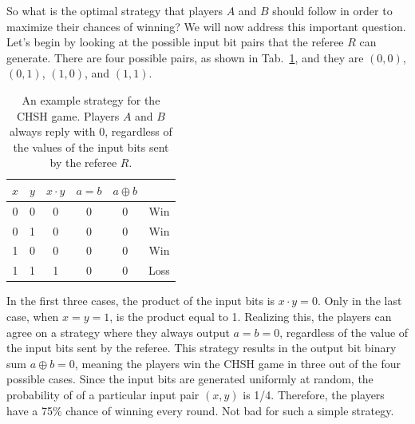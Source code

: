 So what is the optimal strategy that players $A$ and $B$ should follow in order to maximize their chances of winning?
We will now address this important question.
Let's begin by looking at the possible input bit pairs that the referee $R$ can generate.
There are four possible pairs, as shown in Tab.~\ref{tab:4-2_chsh_strategy}, and they are $(0,0)$, $(0,1)$, $(1,0)$, and $(1,1)$.
\begin{table}[h]
    \setcellgapes{5pt}
    \renewcommand\theadfont{}
    \makegapedcells
    \centering
    \begin{tabular}{cccccc}
        \hline
        $x$ & $y$ & $x\cdot y$ & $a=b$ & $a\oplus b$ & \\
        \hline
        0 & 0 & 0 & 0 & 0 & Win \\
        0 & 1 & 0 & 0 & 0 & Win \\
        1 & 0 & 0 & 0 & 0 & Win \\
        1 & 1 & 1 & 0 & 0 & Loss \\
        \hline
    \end{tabular}
    \caption[CHSH game classical strategy.]{An example strategy for the CHSH game. Players $A$ and $B$ always reply with 0, regardless of the values of the input bits sent by the referee $R$.}
    \label{tab:4-2_chsh_strategy}
\end{table}
In the first three cases, the product of the input bits is $x\cdot y=0$. Only in the last case, when $x=y=1$, is the product equal to 1.
Realizing this, the players can agree on a strategy where they always output $a=b=0$, regardless of the value of the input bits sent by the referee.
This strategy results in the output bit binary sum $a\oplus b=0$, meaning the players win the CHSH game in three out of the four possible cases.
Since the input bits are generated uniformly at random, the probability of of a particular input pair $(x,y)$ is 1/4.
Therefore, the players have a 75\% chance of winning every round.
Not bad for such a simple strategy.

